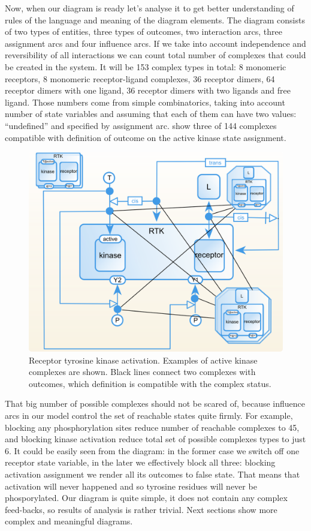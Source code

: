 Now, when our diagram is ready let's analyse it to get better understanding of rules of the language and meaning of the diagram elements. The diagram consists of two types of entities, three types of outcomes, two interaction arcs, three assignment arcs and four influence arcs. If we take into account independence and reversibility  of all interactions we can count total number of complexes that could be created in the system. It will be 153 complex types in total: 8 monomeric receptors, 8 monomeric receptor-ligand complexes, 36 receptor dimers, 64 receptor dimers with one ligand, 36 receptor dimers with two ligands and free ligand. Those numbers come from simple combinatorics, taking into account number of state variables and assuming that each of them can have two values: ``undefined'' and specified by assignment arc.  show three of 144 complexes compatible with definition of outcome on the active kinase state assignment.
\begin{figure}[H]
  \centering
  \vspace*{-0.75em}
  \includegraphics[scale=0.75]{examples/rtk-complex.png}
   \caption{Receptor tyrosine kinase activation. Examples of active kinase complexes are shown. Black lines connect two complexes with outcomes, which definition is compatible with the complex status. }
  \label{fig:rtk-complexes}
\end{figure}

That big number of possible complexes should not  be scared of, because influence arcs in our model control the set of reachable states quite firmly. For example, blocking any phosphorylation sites reduce number of reachable complexes to 45, and blocking kinase activation reduce total set of possible complexes types to just 6. It could be easily seen from the diagram: in the former case we switch off one receptor state variable, in the later we effectively block all three: blocking activation assignment we render all its outcomes to false state. That means that activation will never happened and so tyrosine residues will never be phosporylated. Our diagram is quite simple, it does not contain any complex feed-backs, so results of analysis is rather trivial. Next sections show more complex and meaningful diagrams.
